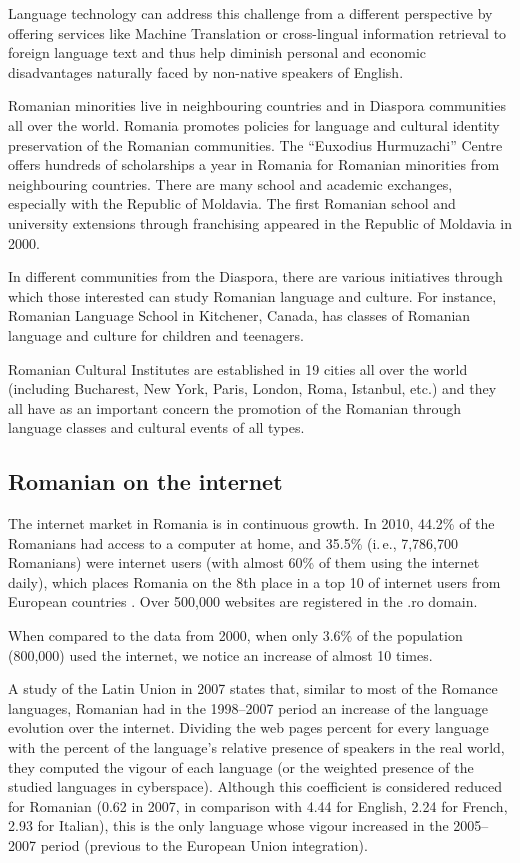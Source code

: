 \begin{multicols}{2}
Language technology can address this challenge from a different perspective by offering services like Machine Translation or cross-lingual information retrieval to foreign language text and thus help diminish personal and economic disadvantages naturally faced by non-native speakers of English.

Romanian minorities live in neighbouring countries and in Diaspora communities all over the world. Romania promotes policies for language and cultural identity preservation of the Romanian communities. The ``Euxodius Hurmuzachi'' Centre offers hundreds of scholarships a year in Romania for Romanian minorities from neighbouring countries. There are many school and academic exchanges, especially with the Republic of Moldavia. The first Romanian school and university extensions through franchising appeared in the Republic of Moldavia in 2000.

In different communities from the Diaspora, there are various initiatives through which those interested can study Romanian language and culture. For instance, Romanian Language School in Kitchener, Canada, has classes of Romanian language and culture for children and teenagers.

Romanian Cultural Institutes are established in 19 cities all over the world (including Bucharest, New York, Paris, London, Roma, Istanbul, etc.) and they all have as an important concern the promotion of the Romanian through language classes and cultural events of all types.

\subsection{Romanian on the internet}

The internet market in Romania is in continuous growth. In 2010, 44.2\% of the Romanians had access to a computer at home, and 35.5\% (i.\,e., 7,786,700 Romanians) were internet users \cite{urlInternetStatsRO} (with almost 60\% of them using the internet daily), which places Romania on the 8th place in a top 10 of internet users from European countries \cite{urlInternetStatsEU}. Over 500,000 websites are registered in the .ro domain.

When compared to the data from 2000, when only 3.6\% of the population (800,000) used the internet, we notice an increase of almost 10 times.

A study of the Latin Union in 2007 \cite{uniunealat} states that, similar to most of the Romance languages, Romanian had in the 1998--2007 period an increase of the language evolution over the internet. Dividing the web pages percent for every language with the percent of the language’s relative presence of speakers in the real world, they computed the vigour of each language (or the weighted presence of the studied languages in cyberspace). Although this coefficient is considered reduced for Romanian (0.62 in 2007, in comparison with 4.44 for English, 2.24 for French, 2.93 for Italian), this is the only language whose vigour increased in the 2005--2007 period (previous to the European Union integration). 


\end{multicols}
